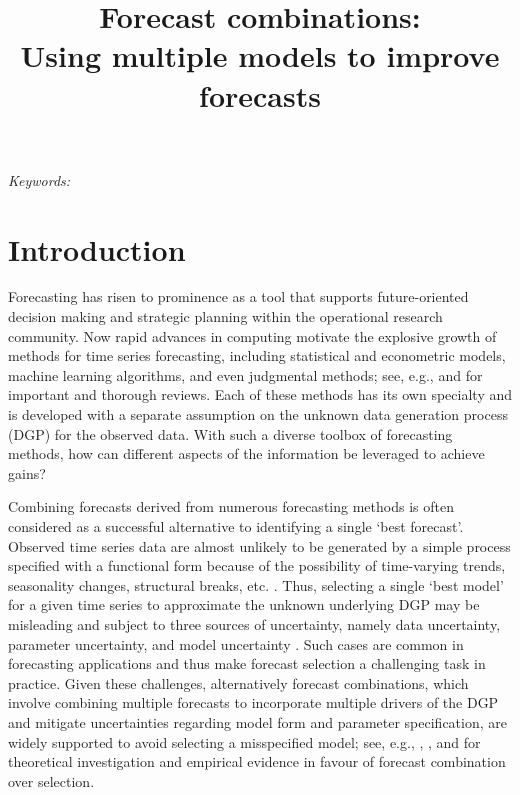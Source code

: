 \documentclass[11pt]{article}
\begin{document}
\def\spacingset#1{\renewcommand{\baselinestretch}%
{#1}\small\normalsize} \spacingset{1.5}

\title{\bf Forecast combinations: \\Using multiple models to improve forecasts}

\maketitle

\bigskip
\begin{abstract}

\end{abstract}

\noindent%
{\it Keywords:}
\vfill

\bigskip

\spacingset{1.5}

\section{Introduction}
\label{sec:introduction}

Forecasting has risen to prominence as a tool that supports future-oriented decision making and strategic planning within the operational research community. Now rapid advances in computing motivate the explosive growth of methods for time series forecasting, including statistical and econometric models, machine learning algorithms, and even judgmental methods; see, e.g., \cite{De_Gooijer2006-eg} and \cite{Petropoulos2021-ft} for important and thorough reviews. Each of these methods has its own specialty and is developed with a separate assumption on the unknown data generation process (DGP) for the observed data. With such a diverse toolbox of forecasting methods, how can different aspects of the information be leveraged to achieve gains?

Combining forecasts derived from numerous forecasting methods is often considered as a successful alternative to identifying a single `best forecast'. Observed time series data are almost unlikely to be generated by a simple process specified with a functional form because of the possibility of time-varying trends, seasonality changes, structural breaks, etc. \citep{Clements1998-bu}. Thus, selecting a single `best model' for a given time series to approximate the unknown underlying DGP may be misleading and subject to three sources of uncertainty, namely data uncertainty, parameter uncertainty, and model uncertainty \citep{Petropoulos2018-fw,Kourentzes2019-na}. Such cases are common in forecasting applications and thus make forecast selection a challenging task in practice. Given these challenges, alternatively forecast combinations, which involve combining multiple forecasts to incorporate multiple drivers of the DGP and mitigate uncertainties regarding model form and parameter specification, are widely supported to avoid selecting a misspecified model; see, e.g., \cite{Kolassa2011-ai}, \cite{Chan2018-jl}, and \cite{Makridakis2020-hu} for theoretical investigation and empirical evidence in favour of forecast combination over selection.
\end{document}
